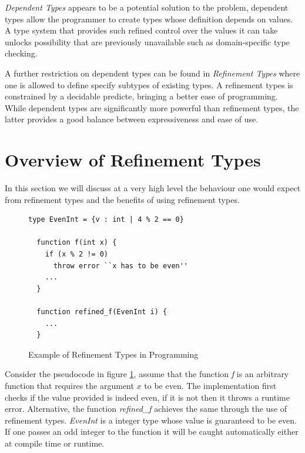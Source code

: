 \documentclass[a4paper,12pt]{report}
\begin{document}
\par
\textit{Dependent Types} \cite{depenTypeAtWork} appears to be a potential solution 
to the problem, dependent types allow the programmer to create types whose 
definition depends on values. A type system that provides such refined 
control over the values it can take unlocks possibility that are previously 
unavailable such as domain-specific type checking.

\par
A further restriction on dependent types can be found in \textit{Refinement 
Types} \cite{refinementTypes} where one is allowed to define specify subtypes 
of existing types. A refinement types is constrained by a decidable predicte, 
bringing a better ease of programming. While dependent types are significantly 
more powerful than refinement types, the latter provides a good balance between 
expressiveness and ease of use.

\section{Overview of Refinement Types}
In this section we will discuss at a very high level the behaviour one would 
expect from refinement types and the benefits of using refinement types. 

\begin{figure}[h] 
  \begin{lstlisting}[mathescape=true] 
  type EvenInt = {v : int | 4 % 2 == 0}
  
  function f(int x) {
    if (x % 2 != 0) 
      throw error ``x has to be even''
    ...
  }
  
  function refined_f(EvenInt i) {
    ...
  }
  \end{lstlisting}
  \caption{Example of Refinement Types in Programming}
  \label{code:refine}
\end{figure}

\par
Consider the pseudocode in figure \ref{code:refine}, assume that the function 
\textit{f} is an arbitrary function that requires the argument $x$ to be even.
The implementation first checks if the value provided is indeed even, if it 
is not then it throws a runtime error. Alternative, the function \textit{refined\_f} 
achieves the same through the use of refinement types. \textit{EvenInt} is a 
integer type whose value is guaranteed to be even. If one passes an odd integer 
to the function it will be caught automatically either at compile time or 
runtime. 
\end{document}

